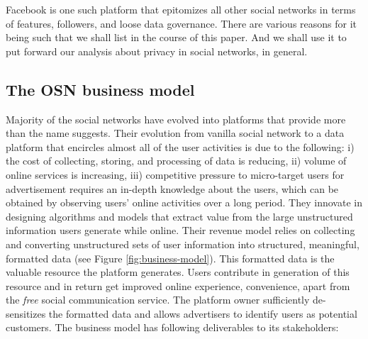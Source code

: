 \documentclass[runningheads]{llncs}
\begin{document}
Facebook is one such platform that epitomizes all other social
networks in terms of features, followers, and loose data
governance. There are various reasons for it being such that we shall
list in the course of this paper. And we shall use it to put forward
our analysis about privacy in social networks, in general.



\subsection{The OSN business model}
\noindent Majority of the social networks have evolved into platforms
that provide more than the name suggests. Their evolution from vanilla
social network to a data platform that encircles almost all of the
user activities is due to the following: i) the cost of collecting,
storing, and processing of data is reducing, ii) volume of online
services is increasing, iii) competitive pressure to micro-target
users for advertisement requires an in-depth knowledge about the
users, which can be obtained by observing users' online activities
over a long period. They innovate in designing algorithms and models
that extract value from the large unstructured information users
generate while online. Their revenue model relies on collecting and
converting unstructured sets of user information into structured,
meaningful, formatted data (see Figure \ref{fig:business-model}). This
formatted data is the valuable resource the platform generates. Users
contribute in generation of this resource and in return get improved
online experience, convenience, apart from the \textit{free} social
communication service. The platform owner sufficiently de-sensitizes
the formatted data and allows advertisers to identify users as
potential customers. The business model has following deliverables to
its stakeholders:
\end{document}

